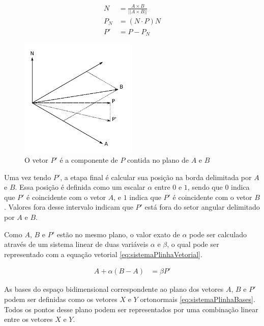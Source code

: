 \documentclass[brazil,pagestart=firstchapter]{abnt}
\begin{document}
\begin{align}
\label{eq:normal}
N   & = \frac{A \times B}{ || A \times B || }   \\
\label{eq:Pnormal}
P_N & = (N \cdot P) N                           \\
\label{eq:Plinha}
P'  & = P - P_N
\end{align}

\begin{figure}[h]
\centering
\includegraphics[width=0.5\textwidth]{img/geometria_ABCD3.pdf}
\caption{O vetor $P'$ é a componente de $P$ contida no plano de $A$ e $B$}
\label{fig:geometria_ABCD3}
\end{figure}

Uma vez tendo $P'$, a etapa final é calcular sua posição na borda delimitada
por $A$ e $B$. Essa posição é definida como um escalar $\alpha$ entre $0$ e
$1$, sendo que $0$ indica que $P'$ é coincidente com o vetor $A$, e $1$
indica que $P'$ é coincidente com o vetor $B$. Valores fora desse intervalo
indicam que $P'$ está fora do setor angular delimitado por $A$ e $B$.

Como $A$, $B$ e $P'$ estão no mesmo plano, o valor exato de $\alpha$ pode
ser calculado através de um sistema linear de duas variáveis $\alpha$ e
$\beta$, o qual pode ser representado com a equação vetorial
\eqref{eq:sistemaPlinhaVetorial}.

\begin{align}
\label{eq:sistemaPlinhaVetorial}
A   + \alpha (B-A)   & = \beta P'
\end{align}

As bases do espaço bidimensional correspondente ao plano dos vetores $A$,
$B$ e $P'$ podem ser definidas como os vetores $X$ e $Y$ ortonormais
\eqref{eq:sistemaPlinhaBases}. Todos os pontos desse plano podem ser
representados por uma combinação linear entre os vetores $X$ e $Y$.
\end{document}
